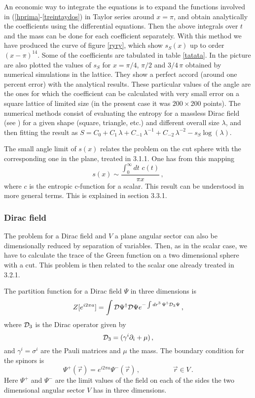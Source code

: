 \documentclass[11pt]{article}
\begin{document}
 
 
An economic way to integrate the equations is to expand the functions involved in (\ref{hprima}-\ref{treintaydos}) in Taylor series around $x=\pi$, and obtain analytically the coefficients using the differential equations. Then the above integrals over $t$ and the mass can be done for each coefficient separately. With this method we have produced the curve of figure \ref{ryry}, which show $s_S(x)$ up to order $(x-\pi)^{14}$. Some of the coefficients are tabulated in table \ref{tatata}. In the picture are also plotted the values of $s_S$ for $x=\pi / 4$, $\pi /2$ and $3/4 \,\pi$ obtained by numerical simulations in the lattice. They show a perfect accord (around one percent error) with the analytical results. These particular values of the angle are the ones for which the coefficient can be calculated with very small error on a square lattice of limited size (in the present case it was $200\times 200$ points). The numerical methods consist of evaluating the entropy for a massless Dirac field  (see \cite{log}) for a given shape (square, triangle, etc.) and different overall size $\lambda$, and then fitting the result as $S=C_0+C_1\, \lambda+C_{-1}\, \lambda^{-1} +C_{-2} \,\lambda^{-2}- s_S \log(\lambda)$. 
 
The small angle limit of $s(x)$ relates the problem on the cut sphere with the corresponding one in the plane, treated in 3.1.1. One has from this mapping 
\begin{equation}
s(x)\sim\frac{\int_0^\infty dt\,\,c(t)}{\pi x}\,,\label{angulochico}
\end{equation}
 where $c$ is the entropic c-function for a scalar. This result can be understood in more general terms. This is explained in section 3.3.1.
\subsubsection{Dirac field}
The problem for a Dirac field and $V$ a plane angular sector can also be dimensionally reduced by separation of variables. Then, as in the scalar case, we have to calculate the trace of the Green function on a two dimensional sphere with a cut. This problem is then related to the scalar one already treated in 3.2.1. 

 The partition function for a Dirac field  $\Psi$ in three  dimensions is  
\begin{equation}
Z[e^{i 2 \pi a}]=\int {\cal D}\Psi^\dagger {\cal D}\Psi e^{-\int dr^3 \,\Psi^\dagger  {\cal D}_3 \Psi}\,,\label{eee}
\end{equation}
where ${\cal D}_3$ is the Dirac operator given by
\begin{equation}
{\cal D}_3=(\gamma^{i}\partial_i+\mu)\,,
\end{equation}
 and $\gamma^{i}=\sigma^{i}$ are the Pauli matrices and $\mu$ the mass. The boundary condition for the spinors is 
 \begin{equation}
\Psi^+(\vec{r})=e^{i 2\pi a} \Psi^-(\vec{r})\,,\hspace{2cm} \vec{r}\in V\,.\label{bounj}
\end{equation}
Here $\Psi^+$ and $\Psi^-$ are the limit values of the field on each of the sides the two dimensional angular sector $V$ has in three dimensions. 
\end{document}
